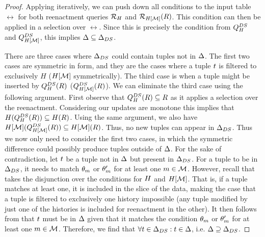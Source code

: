 \begin{proof}
Applying  iteratively, we can push down all conditions to the input table $\rel$ for both reenactment queries $\mathcal{R}_{H}$ and $\mathcal{R}_{H[\mathcal{M}]}(R)$. This condition can then be applied in a selection over $\rel$. Since this is precisely the condition from $Q_{H}^{DS}$ and $Q_{H[\mathcal{M}]}^{DS}$, this implies $\Delta \subseteq \Delta_{DS}$.


\proofpar{$\dfull \supseteq \dslice$} There are three cases where $\Delta_{DS}$ could contain tuples not in $\Delta$. The first two cases are symmetric in form, and they are the cases where a tuple $t$ is filtered to exclusively $H$ ($H[\mathcal{M}]$ symmetrically). The third case is when a tuple might be inserted by $Q_{H}^{DS}(R)$ ($Q_{H[\mathcal{M}]}^{DS}(R)$).
We can eliminate the third case using the following argument. First observe that $Q_{H}^{DS}(R) \subseteq R$ as it applies a selection over the reenactment. Considering our updates are monotone this implies that $H(Q_{H}^{DS}(R)) \subseteq H(R)$. Using the same argument, we also have $H[\mathcal{M}](Q_{H[\mathcal{M}]}^{DS}(R)) \subseteq H[\mathcal{M}](R)$. Thus, no new tuples can appear in $\Delta_{DS}$.
  Thus we now only need to consider the first two cases, in which the symmetric difference could possibly produce tuples outside of $\Delta$. For the sake of contradiction, let $t$ be a tuple not in $\Delta$ but present in $\Delta_{DS}$. For a tuple to be in $\Delta_{DS}$, it needs to match $\theta_m$ or $\theta_m'$ for at least one $m \in \mathcal{M}$. However, recall that  takes the disjunction over the conditions for $H$ and $H[\mathcal{M}]$. That is, if a tuple matches at least one, it is included in the slice of the data, making the case that a tuple is filtered to exclusively one history impossible (any tuple modified by just one of the histories is included for reenactment in the other). It then follows from  that $t$ must be in $\Delta$ given that it matches the condition $\theta_m$ or $\theta_m'$ for at least one $m \in \mathcal{M}$. Therefore, we find that $\forall t \in \Delta_{DS}: t \in \Delta$, i.e. $\dfull \supseteq \dslice$.

\end{proof}



